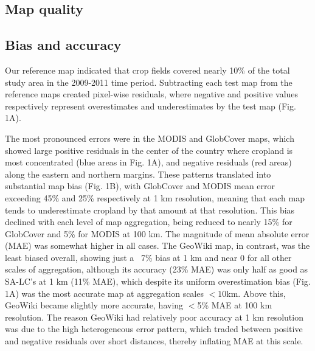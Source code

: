 \documentclass{pnastwo}
\begin{document}
\begin{article}
\vspace{-0.5 cm}
\section{Map quality}
\subsection{Bias and accuracy}

Our reference map indicated that crop fields covered nearly 10\% of the total study area in the 2009-2011 time period. Subtracting each test map from the reference maps created pixel-wise residuals, where negative and positive values respectively represent overestimates and underestimates by the test map (Fig. 1A).    


The most pronounced errors were in the MODIS and GlobCover maps, which showed large positive residuals in the center of the country where cropland is most concentrated (blue areas in Fig. 1A), and negative residuals (red areas) along the eastern and northern margins.
These patterns translated into substantial map bias (Fig. 1B), with GlobCover and MODIS mean error exceeding 45\% and 25\% respectively at 1 km resolution, meaning that each map tends to underestimate cropland by that amount at that resolution. This bias declined with each level of map aggregation, being reduced to nearly 15\% for GlobCover and 5\% for MODIS at 100 km. The magnitude of mean absolute error (MAE) was somewhat higher in all cases. The GeoWiki map, in contrast, was the least biased overall, showing just a ~7\% bias at 1 km and near 0 for all other scales of aggregation, although its accuracy (23\% MAE) was only half as good as SA-LC's at 1 km (11\% MAE), which despite its uniform overestimation bias (Fig. 1A) was the most accurate map at aggregation scales $<10$km. Above this, GeoWiki became slightly more accurate, having $<$5\% MAE at 100 km resolution. The reason GeoWiki had relatively poor accuracy at 1 km resolution was due to the high heterogeneous error pattern, which traded between positive and negative residuals over short distances, thereby inflating MAE at this scale.  


\end{article}
\end{document}
